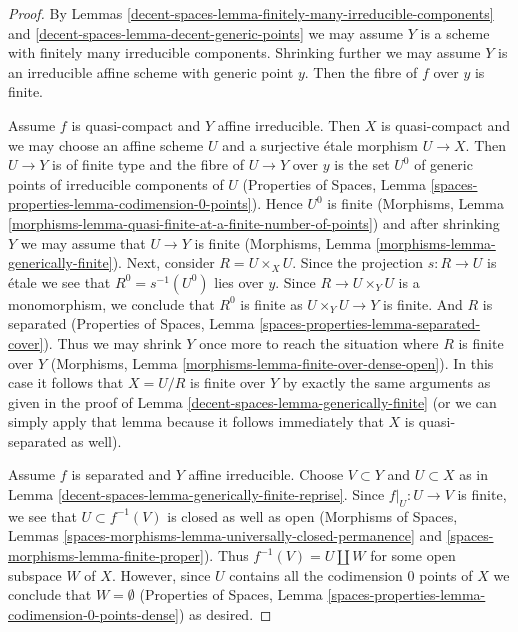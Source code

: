 \begin{proof}
By Lemmas \ref{decent-spaces-lemma-finitely-many-irreducible-components} and
\ref{decent-spaces-lemma-decent-generic-points} we may assume $Y$ is a scheme
with finitely many irreducible components. Shrinking further we
may assume $Y$ is an irreducible affine scheme with generic point $y$.
Then the fibre of $f$ over $y$ is finite.

\medskip\noindent
Assume $f$ is quasi-compact and $Y$ affine irreducible. Then $X$ is
quasi-compact and we may choose an affine scheme $U$ and a
surjective \'etale morphism $U \to X$. Then $U \to Y$ is of finite type
and the fibre of $U \to Y$ over $y$ is the set $U^0$ of generic points of
irreducible components of $U$ (Properties of Spaces, Lemma
\ref{spaces-properties-lemma-codimension-0-points}).
Hence $U^0$ is finite
(Morphisms, Lemma
\ref{morphisms-lemma-quasi-finite-at-a-finite-number-of-points})
and after shrinking $Y$ we may assume that $U \to Y$ is finite
(Morphisms, Lemma \ref{morphisms-lemma-generically-finite}).
Next, consider $R = U \times_X U$. Since the projection
$s : R \to U$ is \'etale we see that $R^0 = s^{-1}(U^0)$
lies over $y$. Since $R \to U \times_Y U$ is a monomorphism,
we conclude that $R^0$ is finite as $U \times_Y U \to Y$ is finite.
And $R$ is separated
(Properties of Spaces, Lemma \ref{spaces-properties-lemma-separated-cover}).
Thus we may shrink $Y$ once more to reach the situation
where $R$ is finite over $Y$
(Morphisms, Lemma \ref{morphisms-lemma-finite-over-dense-open}).
In this case it follows that $X = U/R$ is finite over $Y$
by exactly the same arguments as given in the proof of
Lemma \ref{decent-spaces-lemma-generically-finite}
(or we can simply apply that lemma because
it follows immediately that $X$ is quasi-separated as well).

\medskip\noindent
Assume $f$ is separated and $Y$ affine irreducible. Choose $V \subset Y$
and $U \subset X$ as in Lemma \ref{decent-spaces-lemma-generically-finite-reprise}.
Since $f|_U : U \to V$ is finite, we see that $U \subset f^{-1}(V)$
is closed as well as open
(Morphisms of Spaces, Lemmas
\ref{spaces-morphisms-lemma-universally-closed-permanence} and
\ref{spaces-morphisms-lemma-finite-proper}).
Thus $f^{-1}(V) = U \amalg W$ for some
open subspace $W$ of $X$. However, since $U$ contains all the codimension
$0$ points of $X$ we conclude that $W = \emptyset$
(Properties of Spaces, Lemma
\ref{spaces-properties-lemma-codimension-0-points-dense})
as desired.
\end{proof}

